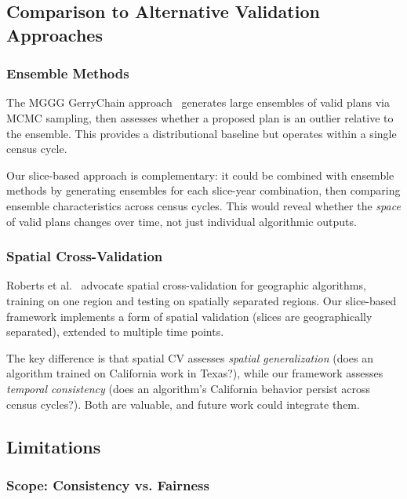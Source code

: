 \subsection{Comparison to Alternative Validation Approaches}

\subsubsection{Ensemble Methods}

The MGGG GerryChain approach~\cite{gerrychain2018} generates large ensembles of valid plans via MCMC sampling, then assesses whether a proposed plan is an outlier relative to the ensemble. This provides a distributional baseline but operates within a single census cycle.

Our slice-based approach is complementary: it could be combined with ensemble methods by generating ensembles for each slice-year combination, then comparing ensemble characteristics across census cycles. This would reveal whether the \textit{space} of valid plans changes over time, not just individual algorithmic outputs.

\subsubsection{Spatial Cross-Validation}

Roberts et al.~\cite{roberts2017} advocate spatial cross-validation for geographic algorithms, training on one region and testing on spatially separated regions. Our slice-based framework implements a form of spatial validation (slices are geographically separated), extended to multiple time points.

The key difference is that spatial CV assesses \textit{spatial generalization} (does an algorithm trained on California work in Texas?), while our framework assesses \textit{temporal consistency} (does an algorithm's California behavior persist across census cycles?). Both are valuable, and future work could integrate them.

\subsection{Limitations}
\label{sec:limitations}

\subsubsection{Scope: Consistency vs. Fairness}

